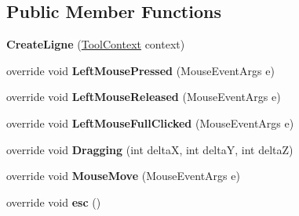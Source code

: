 \subsection*{Public Member Functions}
\begin{DoxyCompactItemize}
\item 
\hypertarget{class_interface_graphique_1_1_tools_1_1_create_ligne_a0da55f9f6d189a4e214333cd532c31bc}{}{\bfseries Create\+Ligne} (\hyperlink{class_interface_graphique_1_1_tools_1_1_tool_context}{Tool\+Context} context)\label{class_interface_graphique_1_1_tools_1_1_create_ligne_a0da55f9f6d189a4e214333cd532c31bc}

\item 
\hypertarget{class_interface_graphique_1_1_tools_1_1_create_ligne_a952552e78bc24616026ecd5502dcd0ac}{}override void {\bfseries Left\+Mouse\+Pressed} (Mouse\+Event\+Args e)\label{class_interface_graphique_1_1_tools_1_1_create_ligne_a952552e78bc24616026ecd5502dcd0ac}

\item 
\hypertarget{class_interface_graphique_1_1_tools_1_1_create_ligne_aed5895d2081942fbe80022c99b8de5dc}{}override void {\bfseries Left\+Mouse\+Released} (Mouse\+Event\+Args e)\label{class_interface_graphique_1_1_tools_1_1_create_ligne_aed5895d2081942fbe80022c99b8de5dc}

\item 
\hypertarget{class_interface_graphique_1_1_tools_1_1_create_ligne_a5ea6ec82fe9e433ee36d6ca2fcbf6418}{}override void {\bfseries Left\+Mouse\+Full\+Clicked} (Mouse\+Event\+Args e)\label{class_interface_graphique_1_1_tools_1_1_create_ligne_a5ea6ec82fe9e433ee36d6ca2fcbf6418}

\item 
\hypertarget{class_interface_graphique_1_1_tools_1_1_create_ligne_a5862dbb249d4286c8663e47730a4ec0d}{}override void {\bfseries Dragging} (int delta\+X, int delta\+Y, int delta\+Z)\label{class_interface_graphique_1_1_tools_1_1_create_ligne_a5862dbb249d4286c8663e47730a4ec0d}

\item 
\hypertarget{class_interface_graphique_1_1_tools_1_1_create_ligne_abc111e3dc2d9dfe15050d58631c45564}{}override void {\bfseries Mouse\+Move} (Mouse\+Event\+Args e)\label{class_interface_graphique_1_1_tools_1_1_create_ligne_abc111e3dc2d9dfe15050d58631c45564}

\item 
\hypertarget{class_interface_graphique_1_1_tools_1_1_create_ligne_ad332e361745a2425029bb2c09614d6ef}{}override void {\bfseries esc} ()\label{class_interface_graphique_1_1_tools_1_1_create_ligne_ad332e361745a2425029bb2c09614d6ef}

\end{DoxyCompactItemize}
